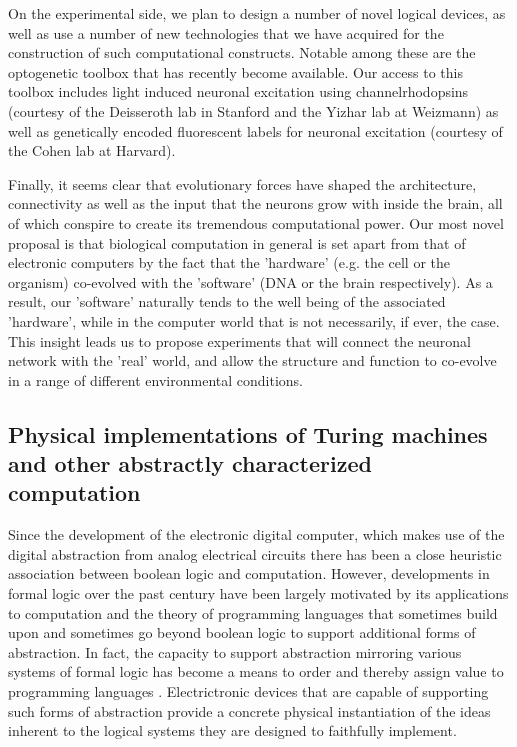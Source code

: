 On the experimental side, we plan to design a number of novel logical devices, as well as use a number of new technologies that we have acquired for the construction of such computational constructs. Notable among these are the optogenetic toolbox that has recently become available. Our access to this toolbox includes light induced neuronal excitation using channelrhodopsins (courtesy of the Deisseroth lab in Stanford and the Yizhar lab at Weizmann) as well as genetically encoded fluorescent labels for neuronal excitation (courtesy of the Cohen lab at Harvard).

 Finally, it seems clear that evolutionary forces have shaped the architecture, connectivity as well as the input that the neurons grow with inside the brain, all of which conspire to create its tremendous computational power. Our most novel proposal is that  biological computation in general is set apart from that of electronic computers by the fact that the 'hardware' (e.g. the cell or the organism) co-evolved with the 'software' (DNA or the brain respectively). As a result, our 'software' naturally tends to the well being of the associated 'hardware', while in the computer world that is not necessarily, if ever, the case. This insight leads us to propose experiments that will connect the neuronal network with the 'real' world, and  allow the structure and function to co-evolve in a range of different environmental conditions.
 

\subsection{Physical implementations of Turing machines and other abstractly characterized
computation}

Since the development of the electronic digital computer, which makes
use of the digital abstraction \cite{Ward1989} from analog electrical circuits
there has been a close heuristic association between boolean logic and
computation. However, developments in formal logic over the past century
have been largely motivated by its applications to computation and the
theory of programming languages that sometimes build upon and sometimes
go beyond boolean logic to support additional forms of abstraction. In
fact, the capacity to support abstraction mirroring various systems of
formal logic has become a means to order and thereby assign value to
programming languages \cite{Abelson1996}. Electrictronic devices that are capable
of supporting such forms of abstraction provide a concrete physical
instantiation of the ideas inherent to the logical systems they are
designed to faithfully implement.

